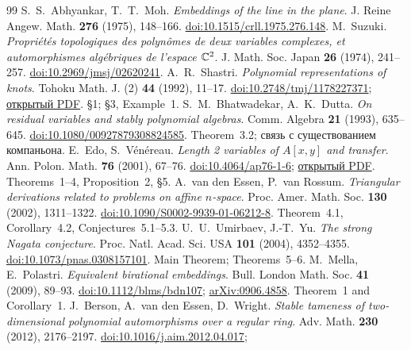\begin{thebibliography}{99}
\small\setlength{\itemsep}{6pt}
S.~S.~Abhyankar, T.~T.~Moh. \emph{Embeddings of the line in the plane}.
J. Reine Angew. Math. \textbf{276} (1975), 148--166.
\href{https://doi.org/10.1515/crll.1975.276.148}{doi:10.1515/crll.1975.276.148}.
M.~Suzuki. \emph{Propriétés topologiques des polynômes de deux variables
complexes, et automorphismes algébriques de l'espace ${\mathbb C}^2$}.
J. Math. Soc. Japan \textbf{26} (1974), 241--257.
\href{https://doi.org/10.2969/jmsj/02620241}{doi:10.2969/jmsj/02620241}.
A.~R.~Shastri. \emph{Polynomial representations of knots}.
Tohoku Math. J. (2) \textbf{44} (1992), 11--17.
\href{https://doi.org/10.2748/tmj/1178227371}{doi:10.2748/tmj/1178227371};
\href{https://www.jstage.jst.go.jp/article/tmj1949/44/1/44_1_11/_pdf}{открытый PDF}.
\S1; \S3, Example~1.
S.~M.~Bhatwadekar, A.~K.~Dutta. \emph{On residual variables and stably
polynomial algebras}. Comm. Algebra \textbf{21} (1993), 635--645.
\href{https://doi.org/10.1080/00927879308824585}{doi:10.1080/00927879308824585}.
Theorem~3.2; связь с существованием компаньона.
E.~Edo, S.~Vénéreau. \emph{Length 2 variables of $A[x,y]$ and transfer}.
Ann. Polon. Math. \textbf{76} (2001), 67--76.
\href{https://doi.org/10.4064/ap76-1-6}{doi:10.4064/ap76-1-6};
\href{https://www.impan.pl/shop/publication/transaction/download/product/85204}{открытый PDF}.
Theorems~1--4, Proposition~2, \S5.
A.~van den Essen, P.~van Rossum. \emph{Triangular derivations related
to problems on affine $n$-space}. Proc. Amer. Math. Soc.
\textbf{130} (2002), 1311--1322.
\href{https://doi.org/10.1090/S0002-9939-01-06212-8}{doi:10.1090/S0002-9939-01-06212-8}.
Theorem~4.1, Corollary~4.2, Conjectures~5.1--5.3.
U.~U.~Umirbaev, J.-T.~Yu. \emph{The strong Nagata conjecture}.
Proc. Natl. Acad. Sci. USA \textbf{101} (2004), 4352--4355.
\href{https://doi.org/10.1073/pnas.0308157101}{doi:10.1073/pnas.0308157101}.
Main Theorem; Theorems~5--6.
M.~Mella, E.~Polastri. \emph{Equivalent birational embeddings}.
Bull. London Math. Soc. \textbf{41} (2009), 89--93.
\href{https://doi.org/10.1112/blms/bdn107}{doi:10.1112/blms/bdn107};
\href{https://arxiv.org/abs/0906.4858}{arXiv:0906.4858}.
Theorem~1 and Corollary~1.
J.~Berson, A.~van den Essen, D.~Wright.
\emph{Stable tameness of two-dimensional polynomial automorphisms over a regular ring}.
Adv. Math. \textbf{230} (2012), 2176--2197.
\href{https://doi.org/10.1016/j.aim.2012.04.017}{doi:10.1016/j.aim.2012.04.017};

\end{thebibliography}

